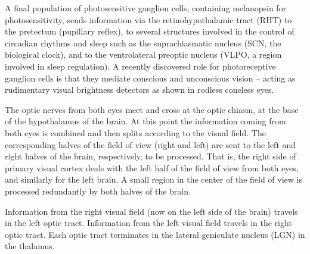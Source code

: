 \documentclass[]{book}
\begin{document}
A final population of photosensitive ganglion cells, containing melanopsin for photosensitivity, sends information via the retinohypothalamic tract (RHT) to the pretectum (pupillary reflex), to several structures involved in the control of circadian rhythms and sleep such as the suprachiasmatic nucleus (SCN, the biological clock), and to the ventrolateral preoptic nucleus (VLPO, a region involved in sleep regulation). A recently discovered role for photoreceptive ganglion cells is that they mediate conscious and unconscious vision -- acting as rudimentary visual brightness detectors as shown in rodless coneless eyes.

The optic nerves from both eyes meet and cross at the optic chiasm, at the base of the hypothalamus of the brain. At this point the information coming from both eyes is combined and then splits according to the visual field. The corresponding halves of the field of view (right and left) are sent to the left and right halves of the brain, respectively, to be processed. That is, the right side of primary visual cortex deals with the left half of the field of view from both eyes, and similarly for the left brain. A small region in the center of the field of view is processed redundantly by both halves of the brain.

Information from the right visual field (now on the left side of the brain) travels in the left optic tract. Information from the left visual field travels in the right optic tract. Each optic tract terminates in the lateral geniculate nucleus (LGN) in the thalamus.
\end{document}
